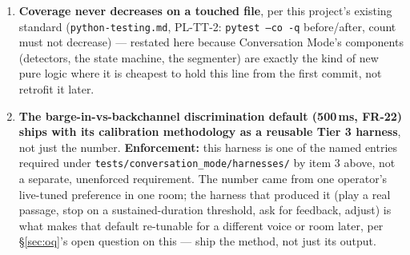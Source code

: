 \documentclass[a4paper,11pt]{report}
\newcommand{\fr}[1]{\textbf{FR-#1}}
\begin{document}
\begin{enumerate}
    Spike 5 incorrectly suspected mid-session) are this item's two
    named worked examples --- once either is resolved, its measurement
    becomes a harness in that directory, re-runnable, not a number
    recorded once and never checked again.
  \item \textbf{Coverage never decreases on a touched file}, per this
    project's existing standard (\texttt{python-testing.md}, PL-TT-2:
    \texttt{pytest --co -q} before/after, count must not decrease) ---
    restated here because Conversation Mode's components (detectors, the
    state machine, the segmenter) are exactly the kind of new pure logic
    where it is cheapest to hold this line from the first commit, not
    retrofit it later.
  \item \textbf{The barge-in-vs-backchannel discrimination default
    (500\,ms, \fr{22}) ships with its calibration methodology as a
    reusable Tier 3 harness}, not just the number. \textbf{Enforcement:}
    this harness is one of the named entries required under
    \texttt{tests/conversation\_mode/harnesses/} by item 3 above, not a
    separate, unenforced requirement. The number came from one
    operator's live-tuned preference in one room; the harness that
    produced it (play a real passage, stop on a sustained-duration
    threshold, ask for feedback, adjust) is what makes that default
    re-tunable for a different voice or room later, per
    \S\ref{sec:oq}'s open question on this --- ship the method, not just
    its output.
\end{enumerate}
\end{document}
